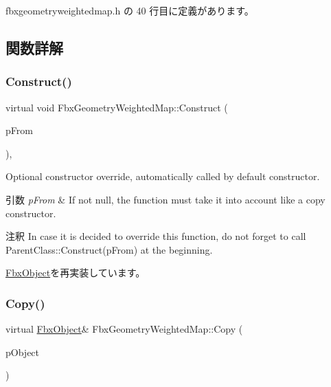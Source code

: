  fbxgeometryweightedmap.\+h の 40 行目に定義があります。



\subsection{関数詳解}
\mbox{\label{class_fbx_geometry_weighted_map_af8485ac8574bf4ac9222de920a98e81f}} 
\subsubsection{\texorpdfstring{Construct()}{Construct()}}
{\footnotesize\ttfamily virtual void Fbx\+Geometry\+Weighted\+Map\+::\+Construct (\begin{DoxyParamCaption}\item[{const \hyperlink{class_fbx_object}{Fbx\+Object} $\ast$}]{p\+From }\end{DoxyParamCaption})\hspace{0.3cm}{\ttfamily [protected]}, {\ttfamily [virtual]}}

Optional constructor override, automatically called by default constructor. 
\begin{DoxyParams}{引数}
{\em p\+From} & If not null, the function must take it into account like a copy constructor. \\
\hline
\end{DoxyParams}
\begin{DoxyRemark}{注釈}
In case it is decided to override this function, do not forget to call Parent\+Class\+::\+Construct(p\+From) at the beginning. 
\end{DoxyRemark}


\hyperlink{class_fbx_object_a313503bc645af3fdceb4a99ef5cea7eb}{Fbx\+Object}を再実装しています。

\mbox{\label{class_fbx_geometry_weighted_map_aa0310025b01de1d69b9f313a886df3c0}} 
\subsubsection{\texorpdfstring{Copy()}{Copy()}}
{\footnotesize\ttfamily virtual \hyperlink{class_fbx_object}{Fbx\+Object}\& Fbx\+Geometry\+Weighted\+Map\+::\+Copy (\begin{DoxyParamCaption}\item[{const \hyperlink{class_fbx_object}{Fbx\+Object} \&}]{p\+Object }\end{DoxyParamCaption})\hspace{0.3cm}{\ttfamily [virtual]}}

